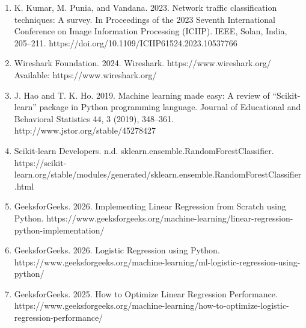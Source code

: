 \documentclass[10pt,sigconf,letterpaper,nonacm]{acmart}
\begin{document}


\begin{enumerate}
\item[1] K. Kumar, M. Punia, and Vandana. 2023. Network traffic classification techniques: A survey. In Proceedings of the 2023 Seventh International Conference on Image Information Processing (ICIIP). IEEE, Solan, India, 205–211. https://doi.org/10.1109/ICIIP61524.2023.10537766

\item[2] Wireshark Foundation. 2024. Wireshark. https://www.wireshark.org/ Available: https://www.wireshark.org/ 
\item[3] J. Hao and T. K. Ho. 2019. Machine learning made easy: A review of “Scikit-learn” package in Python programming language. Journal of Educational and Behavioral Statistics 44, 3 (2019), 348–361. http://www.jstor.org/stable/45278427

\item[4] Scikit-learn Developers. n.d. sklearn.ensemble.RandomForestClassifier. https://scikit-learn.org/stable/modules/generated/sklearn.ensemble.RandomForestClassifier.html

\item[5] GeeksforGeeks. 2026. Implementing Linear Regression from Scratch using Python. https://www.geeksforgeeks.org/machine-learning/linear-regression-python-implementation/
\item[6] GeeksforGeeks. 2026. Logistic Regression using Python. https://www.geeksforgeeks.org/machine-learning/ml-logistic-regression-using-python/
\item[7] GeeksforGeeks. 2025. How to Optimize Linear Regression Performance. https://www.geeksforgeeks.org/machine-learning/how-to-optimize-logistic-regression-performance/

\end{enumerate}
\end{document}
